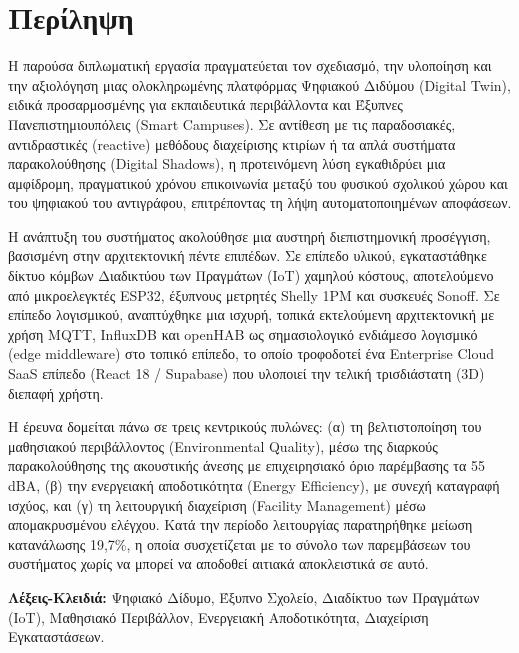 \chapter*{Περίληψη}

Η παρούσα διπλωματική εργασία πραγματεύεται τον σχεδιασμό, την υλοποίηση και την αξιολόγηση μιας ολοκληρωμένης πλατφόρμας Ψηφιακού Διδύμου (\textlatin{Digital Twin}), ειδικά προσαρμοσμένης για εκπαιδευτικά περιβάλλοντα και Έξυπνες Πανεπιστημιουπόλεις (\textlatin{Smart Campuses}). Σε αντίθεση με τις παραδοσιακές, αντιδραστικές (\textlatin{reactive}) μεθόδους διαχείρισης κτιρίων ή τα απλά συστήματα παρακολούθησης (\textlatin{Digital Shadows}), η προτεινόμενη λύση εγκαθιδρύει μια αμφίδρομη, πραγματικού χρόνου επικοινωνία μεταξύ του φυσικού σχολικού χώρου και του ψηφιακού του αντιγράφου, επιτρέποντας τη λήψη αυτοματοποιημένων αποφάσεων.

Η ανάπτυξη του συστήματος ακολούθησε μια αυστηρή διεπιστημονική προσέγγιση, βασισμένη στην αρχιτεκτονική πέντε επιπέδων. Σε επίπεδο υλικού, εγκαταστάθηκε δίκτυο κόμβων Διαδικτύου των Πραγμάτων (\textlatin{IoT}) χαμηλού κόστους, αποτελούμενο από μικροελεγκτές \textlatin{ESP32}, έξυπνους μετρητές \textlatin{Shelly 1PM} και συσκευές \textlatin{Sonoff}. Σε επίπεδο λογισμικού, αναπτύχθηκε μια ισχυρή, τοπικά εκτελούμενη αρχιτεκτονική με χρήση \textlatin{MQTT, InfluxDB} και \textlatin{openHAB} ως σημασιολογικό ενδιάμεσο λογισμικό (\textlatin{edge middleware}) στο τοπικό επίπεδο, το οποίο τροφοδοτεί ένα \textlatin{Enterprise Cloud SaaS} επίπεδο (\textlatin{React 18 / Supabase}) που υλοποιεί την τελική τρισδιάστατη (\textlatin{3D}) διεπαφή χρήστη.

Η έρευνα δομείται πάνω σε τρεις κεντρικούς πυλώνες: (α) τη βελτιστοποίηση του μαθησιακού περιβάλλοντος (\textlatin{Environmental Quality}), μέσω της διαρκούς παρακολούθησης της ακουστικής άνεσης με επιχειρησιακό όριο παρέμβασης τα \textlatin{55 dBA}, (β) την ενεργειακή αποδοτικότητα (\textlatin{Energy Efficiency}), με συνεχή καταγραφή ισχύος, και (γ) τη λειτουργική διαχείριση (\textlatin{Facility Management}) μέσω απομακρυσμένου ελέγχου. Κατά την περίοδο λειτουργίας παρατηρήθηκε μείωση κατανάλωσης 19,7\%, η οποία συσχετίζεται με το σύνολο των παρεμβάσεων του συστήματος χωρίς να μπορεί να αποδοθεί αιτιακά αποκλειστικά σε αυτό.

\noindent\textbf{Λέξεις-Κλειδιά:} Ψηφιακό Δίδυμο, Έξυπνο Σχολείο, Διαδίκτυο των Πραγμάτων (\textlatin{IoT}), Μαθησιακό Περιβάλλον, Ενεργειακή Αποδοτικότητα, Διαχείριση Εγκαταστάσεων.

